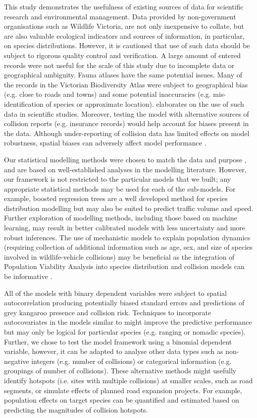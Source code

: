This study demonstrates the usefulness of existing sources of data for scientific research and environmental management. Data provided by non-government organisations such as Wildlife Victoria, are not only inexpensive to collate, but are also valuable ecological indicators and sources of information, in particular, on species distributions. However, it is cautioned that use of such data should be subject to rigorous quality control and verification. A large amount of entered records were not useful for the scale of this study due to incomplete data or geographical ambiguity. Fauna atlases have the same potential issues. Many of the records in the Victorian Biodiversity Atlas were subject to geographical bias (e.g. close to roads and towns) and some potential inaccuracies (e.g. mis-identification of species or approximate location). \cite{grah04} elaborates on the use of such data in scientific studies. Moreover, testing the model with alternative sources of collision reports (e.g. insurance records) would help account for biases present in the data. Although under-reporting of collision data has limited effects on model robustness, spatial biases can adversely affect model performance \citep{snow15}.

Our statistical modelling methods were chosen to match the data and purpose \citep[see][]{wint05,guil15}, and are based on well-established analyses in the modelling literature. However, our framework is not restricted to the particular models that we built; any appropriate statistical methods may be used for each of the sub-models. For example, boosted regression trees are a well developed method for species distribution modelling \citep{elit08} but may also be suited to predict traffic volume and speed. Further exploration of modelling methods, including those based on machine learning, may result in better calibrated models with less uncertainty and more robust inferences. The use of mechanistic models to explain population dynamics (requiring collection of additional information such as age, sex, and size of species involved in wildlife-vehicle collisions) may be beneficial as the integration of Population Viability Analysis into species distribution and collision models can be informative \citep[see][]{tyre01,elit10,pola14}.

All of the models with binary dependent variables were subject to spatial autocorrelation producing potentially biased standard errors and predictions of grey kangaroo presence and collision risk. Techniques to incorporate autocovariates in the models similar to \cite{cras12} might improve the predictive performance but may only be logical for particular species (e.g. ranging or nomadic species). Further, we chose to test the model framework using a binomial dependent variable, however, it can be adapted to analyse other data types such as non-negative integers (e.g. number of collisions) or categorical information (e.g. groupings of number of collisions). These alternative methods might usefully identify hotspots (i.e. sites with multiple collisions) at smaller scales, such as road segments, or simulate effects of planned road expansion projects. For example, population effects on target species can be quantified and estimated based on predicting the magnitudes of collision hotspots.
 
